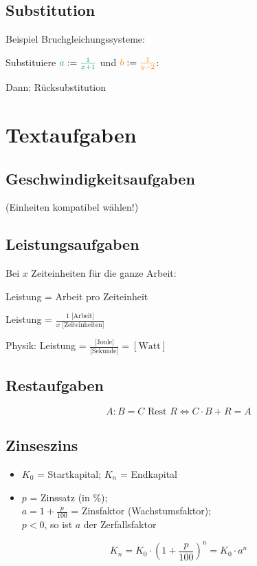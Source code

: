 \begin{multicols}{2}
\subsection*{Substitution}
Beispiel Bruchgleichungssysteme:

Substituiere
${\color{ForestGreen}a}:={\color{ForestGreen}\frac1{x+1}}$ und
${\color{orange}b} : ={\color{orange}\frac1{y-2}}$:

Dann: Rücksubstitution


\hrulefill
\section*{Textaufgaben}
\subsection*{Geschwindigkeitsaufgaben}
 (Einheiten kompatibel wählen!)

\subsection*{Leistungsaufgaben}
Bei $x$ Zeiteinheiten für die ganze Arbeit:

Leistung = Arbeit pro Zeiteinheit

Leistung = $\frac{1 \textrm{ [Arbeit]}}{x \textrm{ [Zeiteinheiten]}}$

Physik: Leistung = $\frac{\textrm{[Joule]}}{\textrm{[Sekunde]}} = [\textrm{Watt}]$

\subsection*{Restaufgaben}
$$A:B = C \textrm{ Rest } R \Longleftrightarrow{}  C\cdot{}B+R = A$$


\subsection*{Zinseszins}
\begin{itemize}
\item $K_0$ = Startkapital; $K_n$ = Endkapital
\item $p$ = Zinssatz (in \%);\\ $a = 1+\frac{p}{100}$ = Zinsfaktor
(Wachstumsfaktor);\\ $p<0$, so ist $a$ der Zerfallsfaktor
\end{itemize}
$$K_n = K_0 \cdot{} \left( 1+\frac{p}{100} \right)^n = K_0\cdot{}a^n$$


\end{multicols}
